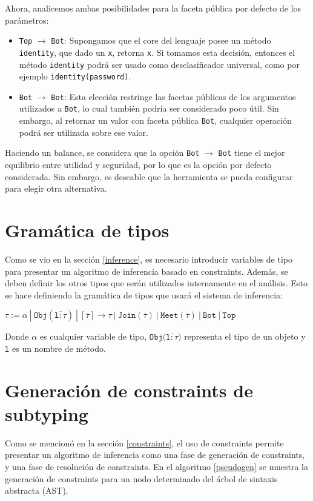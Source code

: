 Ahora, analicemos ambas posibilidades para la faceta pública por defecto de los parámetros:

\begin{itemize}
  \item \texttt{Top} $\rightarrow$ \texttt{Bot}: Supongamos que el core del lenguaje posee un método \texttt{identity}, que dado un \texttt{x}, retorna \texttt{x}. Si tomamos esta decisión, entonces el método \texttt{identity} podrá ser usado como desclasificador universal, como por ejemplo \texttt{identity(password)}.
  \item \texttt{Bot} $\rightarrow$ \texttt{Bot}: Esta elección restringe las facetas públicas de los argumentos utilizados a \texttt{Bot}, lo cual también podría ser considerado poco útil. Sin embargo, al retornar un valor con faceta pública \texttt{Bot}, cualquier operación podrá ser utilizada sobre ese valor.
\end{itemize}

Haciendo un balance, se considera que la opción \texttt{Bot} $\rightarrow$ \texttt{Bot} tiene el mejor equilibrio entre utilidad y seguridad, por lo que es la opción por defecto considerada. Sin embargo, es deseable que la herramienta se pueda configurar para elegir otra alternativa.

\section{Gramática de tipos}
Como se vio en la sección \ref{inference}, es necesario introducir variables de tipo para presentar un algoritmo de inferencia basado en constraints. Además, se deben definir los otros tipos que serán utilizados internamente en el análisis. Esto se hace definiendo la gramática de tipos que usará el sistema de inferencia:

  $\mathtt{\tau := \alpha\ |\ Obj(\overline{l: \tau})\ |\ [\overline{\tau}] \rightarrow \tau \ |\ Join(\overline{\tau})\ |\ Meet(\overline{\tau})\ |\ Bot\ |\ Top}$

Donde $\alpha$ es cualquier variable de tipo, $\mathtt{Obj(\overline{l: \tau}})$ representa el tipo de un objeto y $\mathtt{l}$ es un nombre de método.

\section{Generación de constraints de subtyping} \label{propuestaGen}
Como se mencionó en la sección \ref{constraints}, el uso de constraints permite presentar un algoritmo de inferencia como una fase de generación de constraints, y una fase de resolución de constraints. En el algoritmo \ref{pseudogen} se muestra la generación de constraints para un nodo determinado del árbol de sintaxis abstracta (AST).

